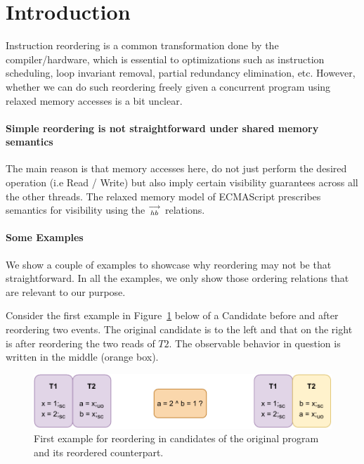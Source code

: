 
\section{Introduction}
    Instruction reordering is a common transformation done by the compiler/hardware, which is essential to optimizations such as instruction scheduling, loop invariant removal, partial redundancy elimination, etc. 
    However, whether we can do such reordering freely given a concurrent program using relaxed memory accesses is a bit unclear. 
     
    \paragraph{Simple reordering is not straightforward under shared memory semantics}
    The main reason is that memory accesses here, do not just perform the desired operation (i.e Read / Write) but also imply certain visibility guarantees across all the other threads.  
    The relaxed memory model of ECMAScript prescribes semantics for visibility using the $\stackrel{\longrightarrow}{_{hb}}$ relations. 
    
    \paragraph{Some Examples}
        We show a couple of examples to showcase why reordering may not be that straightforward. 
        In all the examples, we only show those ordering relations that are relevant to our purpose. 

        Consider the first example in Figure~\ref{reord:example1(a)} below of a Candidate before and after reordering two events.
        The original candidate is to the left and that on the right is after reordering the two reads of $T2$.
        The observable behavior in question is written in the middle (orange box). 
        \begin{figure}[H]
            \centering
            \includegraphics[scale=0.7]{4.InstructionReordering/0.Intro/ReorderingExample1(a).pdf}
            \caption{First example for reordering in candidates of the original program and its reordered counterpart.}
            \label{reord:example1(a)} 
        \end{figure}
        
